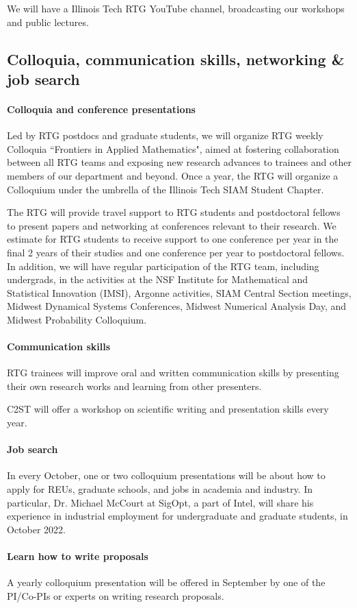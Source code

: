 \documentclass[11pt]{NSFamsart}
\newcommand{\bfparagraph}[1]{\paragraph{\textbf{\textup{#1}}}}
\begin{document}
We will have a Illinois Tech RTG YouTube channel,  broadcasting our     workshops and public lectures.

 



\subsection{Colloquia, communication skills, networking \& job search}

\bfparagraph{Colloquia and conference presentations}
Led by RTG postdocs and graduate students, we will organize RTG  weekly   Colloquia ``Frontiers in Applied Mathematics",  aimed at fostering collaboration between all RTG teams and exposing new research advances to trainees and other members of our department and beyond.   
Once a year, the RTG  will organize a Colloquium  under the umbrella of the Illinois Tech SIAM Student Chapter.  

 
The RTG will provide travel support to RTG students and postdoctoral fellows to   present
papers and networking at conferences relevant to their research. We estimate for RTG students to receive support to one
conference per year in the final 2 years of their studies and one conference per year to postdoctoral fellows.
In addition, we will have regular participation of the  RTG team, including undergrads, in the  activities at the NSF Institute for Mathematical and Statistical Innovation (IMSI),  Argonne activities, SIAM Central Section meetings, Midwest Dynamical Systems Conferences, Midwest Numerical Analysis Day, and Midwest Probability Colloquium.  

\bfparagraph{Communication skills}
RTG trainees  will improve oral and written     communication skills by presenting their own research works and learning from other presenters.

C2ST will offer a workshop on scientific writing and presentation skills 
 every   year. 

\bfparagraph{Job search}
In every October, one or two colloquium presentations will be about how to apply for REUs, graduate schools, and   jobs   in academia and industry. 
In particular, Dr. Michael McCourt at SigOpt, a part of Intel, will share  his experience in industrial employment for undergraduate and graduate students, in October 2022. 

\bfparagraph{Learn how to write proposals}
A yearly colloquium presentation  will be offered in September by one of the PI/Co-PIs or experts on   writing research proposals. 
\end{document}
